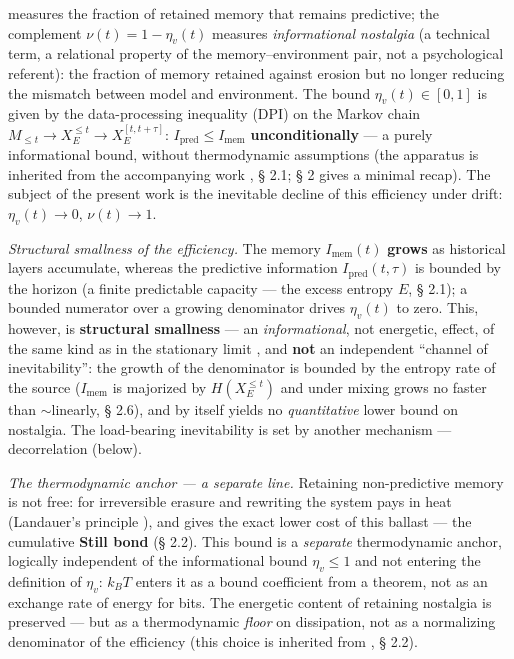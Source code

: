 \documentclass[12pt]{iopart}
\begin{document}
measures the fraction of retained memory that remains predictive; the complement \(\nu(t) = 1 - \eta_v(t)\) measures \emph{informational nostalgia} (a technical term, a relational property of the memory--environment pair, not a psychological referent): the fraction of memory retained against erosion but no longer reducing the mismatch between model and environment. The bound \(\eta_v(t) \in [0,1]\) is given by the data-processing inequality (DPI) on the Markov chain \(M_{\le t} \to X_E^{\le t} \to X_E^{[t,t+\tau]}\): \(I_{\text{pred}} \le I_{\text{mem}}\) \textbf{unconditionally} --- a purely informational bound, without thermodynamic assumptions (the apparatus is inherited from the accompanying work \cite{Andriishin2026b}, § 2.1; § 2 gives a minimal recap). The subject of the present work is the inevitable decline of this efficiency under drift: \(\eta_v(t) \to 0\), \(\nu(t) \to 1\).



\emph{Structural smallness of the efficiency.} The memory \(I_{\text{mem}}(t)\) \textbf{grows} as historical layers accumulate, whereas the predictive information \(I_{\text{pred}}(t,\tau)\) is bounded by the horizon (a finite predictable capacity --- the excess entropy \(E\), § 2.1); a bounded numerator over a growing denominator drives \(\eta_v(t)\) to zero. This, however, is \textbf{structural smallness} --- an \emph{informational}, not energetic, effect, of the same kind as in the stationary limit \cite{Andriishin2026b}, and \textbf{not} an independent ``channel of inevitability'': the growth of the denominator is bounded by the entropy rate of the source (\(I_{\text{mem}}\) is majorized by \(H(X_E^{\le t})\) and under mixing grows no faster than \(\sim\)linearly, § 2.6), and by itself yields no \emph{quantitative} lower bound on nostalgia. The load-bearing inevitability is set by another mechanism --- decorrelation (below).



\emph{The thermodynamic anchor --- a separate line.} Retaining non-predictive memory is not free: for irreversible erasure and rewriting the system pays in heat (Landauer's principle \cite{Landauer1961,Bennett1982}), and \cite{Still2012} gives the exact lower cost of this ballast --- the cumulative \textbf{Still bond} (§ 2.2). This bound is a \emph{separate} thermodynamic anchor, logically independent of the informational bound \(\eta_v \le 1\) and not entering the definition of \(\eta_v\): \(k_B T\) enters it as a bound coefficient from a theorem, not as an exchange rate of energy for bits. The energetic content of retaining nostalgia is preserved --- but as a thermodynamic \emph{floor} on dissipation, not as a normalizing denominator of the efficiency (this choice is inherited from \cite{Andriishin2026b}, § 2.2).
\end{document}
